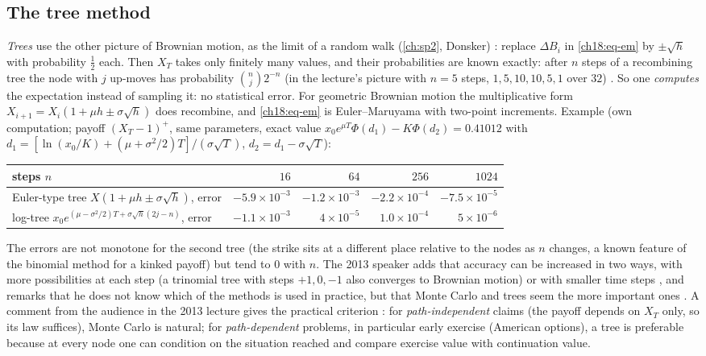 \begin{paracol}{2}
\subsection{The tree method}
\emph{Trees} use the other picture of Brownian motion, as the limit of a random walk (\cref{ch:sp2}, Donsker) : replace $\Delta B_i$ in \eqref{ch18:eq-em} by $\pm\sqrt h$ with probability $\tfrac12$ each. Then $X_T$ takes only finitely many values, and their probabilities are known exactly: after $n$ steps of a recombining tree the node with $j$ up-moves has probability $\binom nj2^{-n}$ (in the lecture's picture with $n=5$ steps, $1,5,10,10,5,1$ over $32$) . So one \emph{computes} the expectation instead of sampling it: no statistical error. For geometric Brownian motion the multiplicative form $X_{i+1}=X_i(1+\mu h\pm\sigma\sqrt h)$ does recombine, and \eqref{ch18:eq-em} is Euler--Maruyama with two-point increments. Example (own computation; payoff $(X_T-1)^+$, same parameters, exact value $x_0e^{\mu T}\Phi(d_1)-K\Phi(d_2)=0.41012$ with $d_1=[\ln(x_0/K)+(\mu+\sigma^2/2)T]/(\sigma\sqrt T)$, $d_2=d_1-\sigma\sqrt T$):
\begin{center}
\small
\begin{tabular}{@{}lrrrr@{}}
\toprule
steps $n$ & $16$ & $64$ & $256$ & $1024$\\
\midrule
Euler-type tree $X(1+\mu h\pm\sigma\sqrt h)$, error & $-5.9\times10^{-3}$ & $-1.2\times10^{-3}$ & $-2.2\times10^{-4}$ & $-7.5\times10^{-5}$\\
log-tree $x_0e^{(\mu-\sigma^2/2)T+\sigma\sqrt h(2j-n)}$, error & $-1.1\times10^{-3}$ & $4\times10^{-5}$ & $1.0\times10^{-4}$ & $5\times10^{-6}$\\
\bottomrule
\end{tabular}
\end{center}
The errors are not monotone for the second tree (the strike sits at a different place relative to the nodes as $n$ changes, a known feature of the binomial method for a kinked payoff) but tend to $0$ with $n$. The 2013 speaker adds that accuracy can be increased in two ways, with more possibilities at each step (a trinomial tree with steps $+1,0,-1$ also converges to Brownian motion) or with smaller time steps , and remarks that he does not know which of the methods is used in practice, but that Monte Carlo and trees seem the more important ones . A comment from the audience in the 2013 lecture gives the practical criterion : for \emph{path-independent} claims (the payoff depends on $X_T$ only, so its law suffices), Monte Carlo is natural; for \emph{path-dependent} problems, in particular early exercise (American options), a tree is preferable because at every node one can condition on the situation reached and compare exercise value with continuation value.

\end{paracol}
